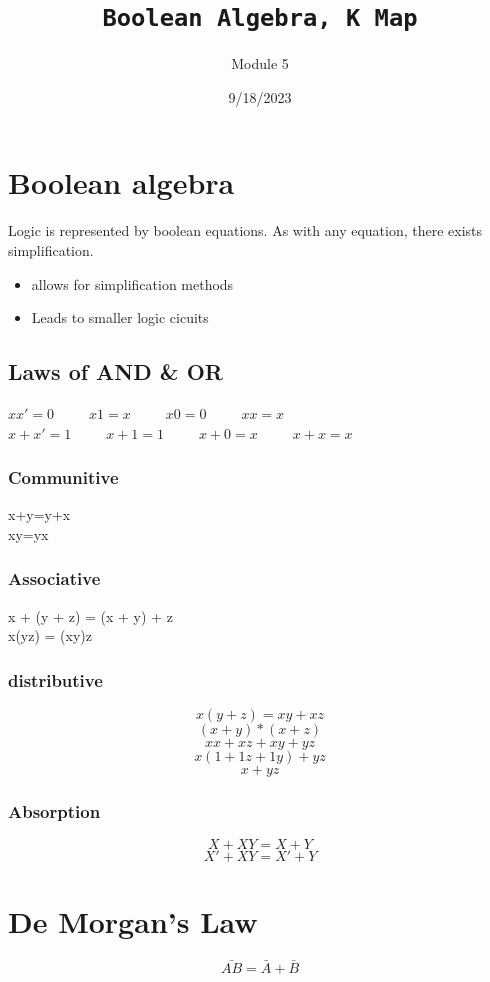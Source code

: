 \documentclass[a4paper,12pt]{article}
\title{\texttt{Boolean Algebra, K Map}\\\hrulefill}
\author{Module 5}
\date{\small{9/18/2023}}
\newenvironment{6mini}{
  \begin{minipage}{6cm}
}{
  \end{minipage}
}
\begin{document}
    \maketitle

    \section{Boolean algebra}
        Logic is represented by boolean equations. As with any equation, there exists simplification.
        \begin{itemize}
            \item allows for simplification methods
            \item Leads to smaller logic cicuits
        \end{itemize}
        
        \subsection*{Laws of AND \& OR}
            $xx'=0$~~~~~$x1=x$~~~~~$x0=0$~~~~~$xx=x$\\
            $x+x'=1$~~~~~$x+1=1$~~~~~$x+0=x$~~~~~$x+x=x$
        
      \begin{6mini}\vspace*{15pt}  
        \subsubsection*{Communitive}
          x+y=y+x\\xy=yx
      \end{6mini}
      \begin{6mini}\vspace*{15pt}
        \subsubsection*{Associative}  
          x + (y + z) = (x + y) + z\\x(yz) = (xy)z
      \end{6mini}
      \begin{6mini}
        \subsubsection*{distributive}  
          \[x(y+z) = xy + xz\] \[(x+y)*(x+z)\] \[xx+xz+xy+yz\] \[x(1+1z+1y)+yz\] \[x+yz\]
      \end{6mini}

      \subsubsection*{Absorption}
        \[X+XY=X+Y\] \[X'+XY=X'+Y\]

      \section*{De Morgan's Law}
        \[\bar{AB}=\bar{A}+\bar{B}\]
\end{document}
